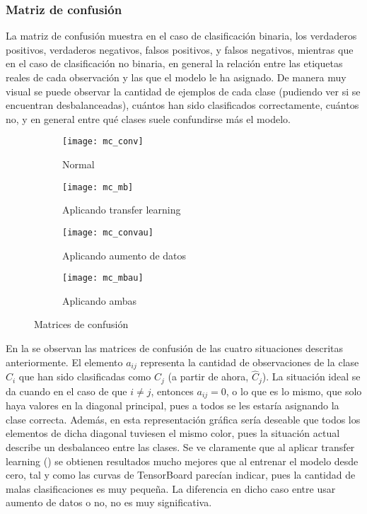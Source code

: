 			\subsubsection{Matriz de confusión}\label{subsub:matriz_confusion}
			
				La matriz de confusión muestra en el caso de clasificación binaria, los verdaderos positivos, verdaderos negativos, falsos positivos, y falsos negativos, mientras que en el caso de clasificación no binaria, en general la relación entre las etiquetas reales de cada observación y las que el modelo le ha asignado\cite{confusion}. De manera muy visual se puede observar la cantidad de ejemplos de cada clase (pudiendo ver si se encuentran desbalanceadas), cuántos han sido clasificados correctamente, cuántos no, y en general entre qué clases suele confundirse más el modelo. \\
				
				\begin{figure}[!h]
					\centering
					\begin{subfigure}{.4\textwidth}
						\centering
						\texttt{[image: mc\_conv]}
						\caption{Normal}
						\label{fig:mc_conv}
					\end{subfigure}\hfill
					\begin{subfigure}{.4\textwidth}
						\centering
						\texttt{[image: mc\_mb]}
						\caption{Aplicando transfer learning}
						\label{fig:mc_mb}
					\end{subfigure}
					\begin{subfigure}{.4\textwidth}
						\centering
						\texttt{[image: mc\_convau]}
						\caption{Aplicando aumento de datos}
						\label{fig:mc_convau}
					\end{subfigure}\hfill
					\begin{subfigure}{.4\textwidth}
						\centering
						\texttt{[image: mc\_mbau]}
						\caption{Aplicando ambas}
						\label{fig:mc_mbau}
					\end{subfigure}
					\caption{Matrices de confusión}
					\label{fig:mc}
				\end{figure}
				
				En la  se observan las matrices de confusión de las cuatro situaciones descritas anteriormente. El elemento $a_{ij}$ representa la cantidad de observaciones de la clase $C_i$ que han sido clasificadas como $C_j$ (a partir de ahora, $\hat{C}_j$). La situación ideal se da cuando en el caso de que $i \neq j$, entonces $a_{ij} = 0$, o lo que es lo mismo, que solo haya valores  en la diagonal principal, pues a todos se les estaría asignando la clase correcta. Además, en esta representación gráfica sería deseable que todos los elementos de dicha diagonal tuviesen el mismo color, pues la situación actual describe un desbalanceo entre las clases. Se ve claramente que al aplicar transfer learning () se obtienen resultados mucho mejores que al entrenar el modelo desde cero, tal y como las curvas de TensorBoard parecían indicar, pues la cantidad de malas clasificaciones es muy pequeña. La diferencia en dicho caso entre usar aumento de datos o no, no es muy significativa. \\
				

